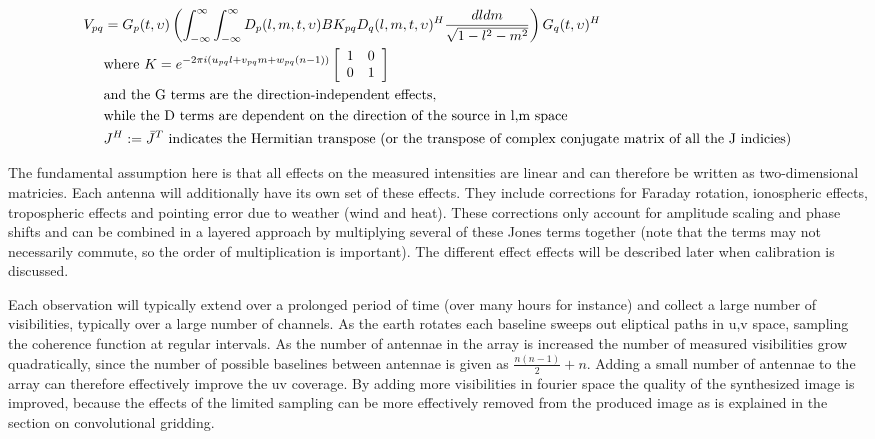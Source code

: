 \documentclass[a4paper,10pt]{report}
\begin{document}
\begin{equation}
\label{eqn_RIME}
\begin{split}
    V_{pq} &= G_p(t,\upsilon)\left(\int_{-\infty}^{\infty}\int_{-\infty}^{\infty}D_p(l,m,t,\upsilon)BK_{pq}D_q(l,m,t,\upsilon)^H\frac{dldm}{\sqrt{1-l^2-m^2}}\right)G_q(t,\upsilon)^H\\
	  &\text{where }K = e^{-2\pi i(u_{pq}l+v_{pq}m+w_{pq}(n-1))}
    \left[\begin{array}{c c}
     1 & 0 \\
     0 & 1 \\
    \end{array}\right]\\
	 &\text{and the G terms are the direction-independent effects,}\\
	 &\text{while the D terms are dependent on the direction of the source in l,m space}\\
 	 &J^H:=\bar J^T \text{ indicates the Hermitian transpose (or the transpose of complex conjugate matrix of all the J indicies)}\\ 
\end{split}
\end{equation}

The fundamental assumption here is that all effects on the measured intensities are linear and can therefore be written as two-dimensional matricies. Each antenna will additionally have its own set of these effects. 
They include corrections for Faraday rotation, ionospheric effects, tropospheric effects and pointing error due to weather (wind and heat). These corrections only account for amplitude scaling and phase shifts and can be 
combined in a layered approach by multiplying several of these Jones terms together (note that the terms may not necessarily commute, so the order of multiplication is important). The different effect effects will be described 
later when calibration is discussed.

Each observation will typically extend over a prolonged period of time (over many hours for instance) and collect a large number of visibilities, typically over a large number of channels. As the earth rotates each baseline sweeps out
eliptical paths in u,v space, sampling the coherence function at regular intervals. As the number of antennae in the array is increased the number of measured visibilities grow quadratically, since the number of possible baselines between 
antennae is given as $\frac{n(n-1)}{2}+n$. Adding a small number of antennae to the array can therefore effectively improve the uv coverage. By adding more visibilities in fourier space the quality of the synthesized 
image is improved, because the effects of the limited sampling can be more effectively removed from the produced image as is explained in the section on convolutional gridding.
\end{document}
